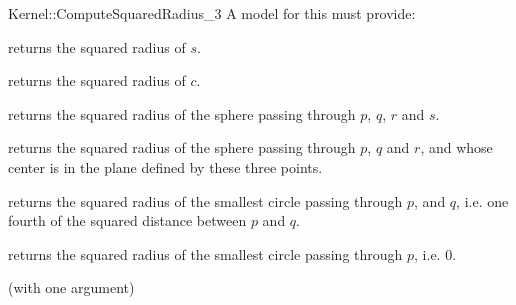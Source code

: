 \begin{ccRefFunctionObjectConcept}{Kernel::ComputeSquaredRadius_3}
A model for this must provide:


       {returns the squared radius of $s$. }

       {returns the squared radius of $c$. }

       {returns the squared radius of the sphere passing through $p$, $q$, $r$
       and $s$. }

       {returns the squared radius of the sphere passing through $p$, $q$ and
       $r$, and whose center is in the plane defined by these three points.}

{returns the squared radius of the smallest circle passing through $p$,
and $q$, i.e. one fourth of the squared distance between $p$ and $q$.}

{returns the squared radius of the smallest circle passing through $p$, i.e. $0$.}

\ccRefines
{} (with one argument)

\ccSeeAlso
{}\\
\\
 \\

\end{ccRefFunctionObjectConcept}
